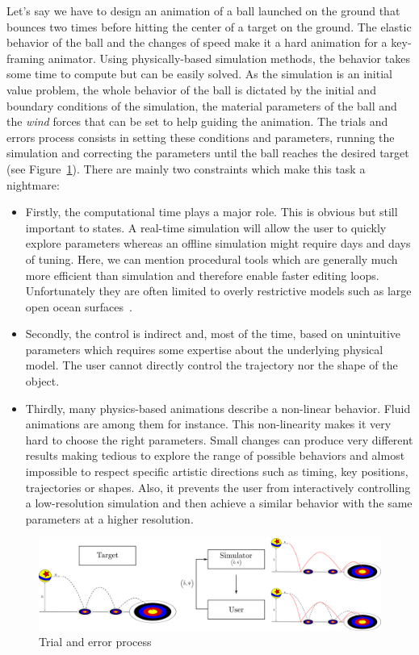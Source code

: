 Let's say we have to design an animation of a ball launched on the ground that bounces two times before hitting the center of a target on the ground. 
The elastic behavior of the ball and the changes of speed make it a hard animation for a key-framing animator. 
Using physically-based simulation methods, the behavior takes some time to compute but can be easily solved.
As the simulation is an initial value problem, the whole behavior of the ball is dictated by the initial and boundary conditions of the simulation, the material parameters of the ball and the \emph{wind} forces that can be set to help guiding the animation. 
The trials and errors process consists in setting these conditions and parameters, running the simulation and correcting the parameters until the ball reaches the desired target (see Figure~\ref{fig:trialErrorProcess}). 
There are mainly two constraints which make this task a nightmare:
\begin{itemize}
	\item Firstly, the computational time plays a major role. 
	This is obvious but still important to states. 
	A real-time simulation will allow the user to quickly explore parameters whereas an offline simulation might require days and days of tuning.
    Here, we can mention procedural tools which are generally much more efficient than simulation and therefore enable faster editing loops. Unfortunately they are often limited to overly restrictive models such as large open ocean surfaces~\cite{hinsinger2002,Tessendorf2004,jeschke2015water,horwath2015empirical}.
	\item Secondly, the control is indirect and, most of the time, based on unintuitive parameters which requires some expertise about the underlying physical model. The user cannot directly control the trajectory nor the shape of the object.
	\item Thirdly, many physics-based animations describe a non-linear behavior. Fluid animations are among them for instance. 
	This non-linearity makes it very hard to choose the right parameters. 
	Small changes can produce very different results making tedious to explore the range of possible behaviors and almost impossible to respect specific artistic directions such as timing, key positions, trajectories or shapes. 
	Also, it prevents the user from interactively controlling a low-resolution simulation and then achieve a similar behavior with the same parameters at a higher resolution.
\end{itemize}

\begin{figure}[!h]
	\centering
	\includegraphics[scale=0.20]{./images/simulationControl/trialError.png}
	\caption[STAR control: Trial and error process]{\label{fig:trialErrorProcess}Trial and error process}
\end{figure}

